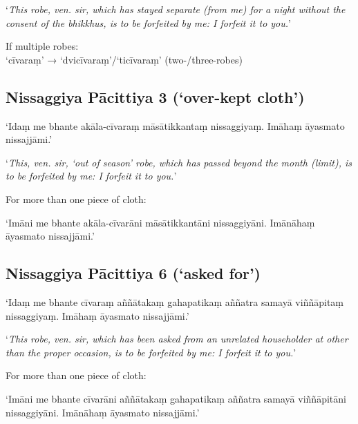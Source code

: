 ‘\emph{This robe, ven. sir, which has stayed separate (from me) for a night
  without the consent of the bhikkhus, is to be forfeited by me: I forfeit it to
  you.}’ 

If multiple robes:\\
‘cīvaraṃ’ → ‘dvicīvaraṃ’/‘ticīvaraṃ’ (two-/three-robes)

 
\subsection{Nissaggiya Pācittiya 3 (‘over-kept cloth’)}

‘Idaṃ me bhante akāla-cīvaraṃ māsātikkantaṃ nissaggiyaṃ. Imāhaṃ āyasmato nissajjāmi.’

‘\emph{This, ven. sir, ‘out of season’ robe, which has passed beyond the month
  (limit), is to be forfeited by me: I forfeit it to you.}’ 

For more than one piece of cloth:

‘Imāni me bhante akāla-cīvarāni māsātikkantāni nissaggiyāni. Imānāhaṃ āyasmato nissajjāmi.’


\subsection{Nissaggiya Pācittiya 6 (‘asked for’)}

‘Idaṃ me bhante cīvaraṃ aññātakaṃ gahapatikaṃ aññatra samayā viññāpitaṃ
nissaggiyaṃ. Imāhaṃ āyasmato nissajjāmi.’

‘\emph{This robe, ven. sir, which has been asked from an unrelated householder at
  other than the proper occasion, is to be forfeited by me: I forfeit it to you.}’

For more than one piece of cloth:

‘Imāni me bhante cīvarāni aññātakaṃ gahapatikaṃ aññatra samayā viññāpitāni
nissaggiyāni. Imānāhaṃ āyasmato nissajjāmi.’



